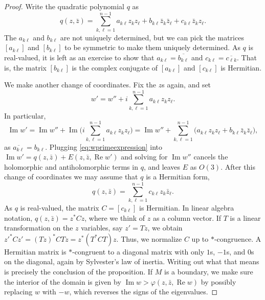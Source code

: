 \documentclass[12pt,openany]{book}
\renewcommand{\Re}{\operatorname{Re}}
\renewcommand{\Im}{\operatorname{Im}}
\theoremstyle{plain}
\theoremstyle{remark}
\theoremstyle{definition}
\theoremstyle{exercise}
\theoremstyle{example}
\begin{document}
\begin{proof}
Write the quadratic polynomial $q$ as
\begin{equation} \label{eq:generalquadraticq}
q(z,\bar{z}) =
\sum_{k,\ell=1}^{n-1}
a_{k\ell} z_kz_\ell
+
b_{k\ell} \bar{z}_k\bar{z}_\ell
+
c_{k\ell} \bar{z}_kz_\ell .
\end{equation}
The $a_{k\ell}$ and $b_{k\ell}$ are not uniquely determined, but
we can pick the matrices $[a_{k\ell}]$ and $[b_{k\ell}]$ to be symmetric
to make them uniquely determined.
As $q$ is real-valued, it is left as an exercise to show that
$a_{k\ell} = \overline{b_{k\ell}}$ and
$c_{k\ell} = \overline{c_{\ell k}}$.  That is, the
matrix $[b_{k\ell}]$ is the complex conjugate of $[a_{k\ell}]$ and
$[c_{k\ell}]$ is Hermitian.

We make another change of coordinates.  Fix the $z$s again, and set
\begin{equation} \label{eq:wprimeexpression}
w' = w'' + i
\sum_{k,\ell=1}^{n-1}
a_{k\ell} z_kz_\ell .
\end{equation}
In particular,
\begin{equation*}
\Im w'
= \Im w''
+ \Im \biggl(
i
\sum_{k,\ell=1}^{n-1}
a_{k\ell} z_kz_\ell
\biggr)
=
\Im w''
+
\sum_{k,\ell=1}^{n-1}
\bigl(
a_{k\ell} z_kz_\ell
+
b_{k\ell} \bar{z}_k\bar{z}_\ell
\bigr) ,
\end{equation*}
as $\overline{a_{k\ell}} = b_{k\ell}$.  Plugging
\eqref{eq:wprimeexpression} into $\Im w' = q(z,\bar{z}) + E(z,\bar{z},\Re w')$
and solving for $\Im w''$ cancels the
holomorphic and antiholomorphic terms in $q$, and leaves $E$ as $O(3)$.
After this change of coordinates we may assume
that $q$ is a Hermitian form,
\begin{equation*}
q(z,\bar{z}) = \sum_{k,\ell=1}^{n-1} c_{k\ell} z_k \bar{z}_\ell .
\end{equation*}
As $q$ is real-valued, the matrix
$C = [ c_{k\ell} ]$ is Hermitian.  In linear algebra notation,
$q(z,\bar{z}) = z^*Cz$,
where we think of $z$ as a column vector.
If $T$ is a linear transformation on the $z$ variables, say $z'=Tz$, we
obtain ${z'}^*Cz' = {(Tz)}^*CTz = z^* ( T^*CT) z$.  Thus, we normalize $C$
up to $*$-congruence.  A Hermitian matrix
is $*$-congruent to a diagonal matrix with only $1$s, $-1$s, and $0$s on the
diagonal, again by Sylvester's law of inertia.
Writing out what that means is precisely the conclusion of the
proposition.
If $M$ is a boundary, we make sure the interior of the domain is
given by $\Im w > \varphi(z,\bar{z},\Re w)$
by possibly replacing $w$ with $-w$, which reverses the signs of the 
eigenvalues.
\end{proof}
\end{document}

